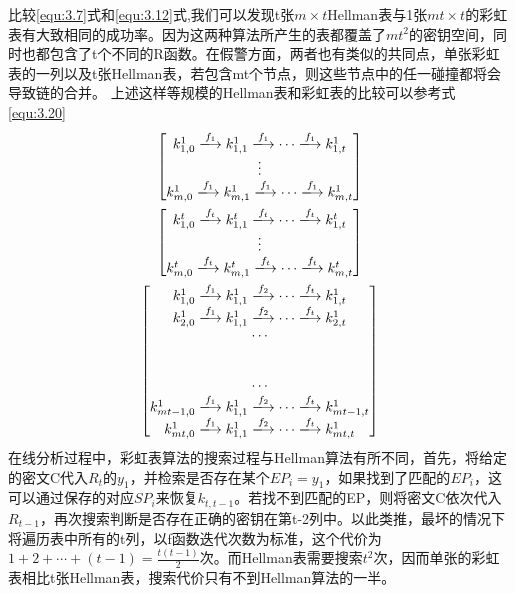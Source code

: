比较\eqref{equ:3.7}式和\eqref{equ:3.12}式,我们可以发现t张$m\times t$Hellman表与1张$mt\times t$的彩虹表有大致相同的成功率。因为这两种算法所产生的表都覆盖了$mt^2$的密钥空间，同时也都包含了t个不同的R函数。在假警方面，两者也有类似的共同点，单张彩虹表的一列以及t张Hellman表，若包含mt个节点，则这些节点中的任一碰撞都将会导致链的合并。
上述这样等规模的Hellman表和彩虹表的比较可以参考式\eqref{equ:3.20}
\begin{gather}
\label{equ:3.20}
\begin{bmatrix}
k_{1,0}^1\xlongrightarrow{f_1} k_{1,1}^1\xlongrightarrow{f_1} \cdots \xlongrightarrow{f_1}k_{1,t}^1 \\
\vdots \\
k_{m,0}^1\xlongrightarrow{f_1} k_{m,1}^1\xlongrightarrow{f_1} \cdots \xlongrightarrow{f_1}k_{m,t}^1 \\
\end{bmatrix} \\ 
\begin{bmatrix}
k_{1,0}^t\xlongrightarrow{f_t} k_{1,1}^t\xlongrightarrow{f_t} \cdots \xlongrightarrow{f_t}k_{1,t}^t \\
\vdots \\
k_{m,0}^t\xlongrightarrow{f_t} k_{m,1}^t\xlongrightarrow{f_t} \cdots \xlongrightarrow{f_t}k_{m,t}^t \\
\end{bmatrix}\\
\begin{bmatrix}
k_{1,0}^1\xlongrightarrow{f_1} k_{1,1}^1\xlongrightarrow{f_2} \cdots \xlongrightarrow{f_t}k_{1,t}^1 \\
k_{2,0}^1\xlongrightarrow{f_1} k_{1,1}^1\xlongrightarrow{f_2} \cdots \xlongrightarrow{f_t}k_{2,t}^1 \\
\cdots \\ 
\\ \\
\cdots \\
k_{mt-1,0}^1\xlongrightarrow{f_1} k_{1,1}^1\xlongrightarrow{f_2} \cdots \xlongrightarrow{f_t}k_{mt-1,t}^1 \\
k_{mt,0}^1\xlongrightarrow{f_1} k_{1,1}^1\xlongrightarrow{f_2} \cdots \xlongrightarrow{f_t}k_{mt,t}^1
\end{bmatrix}
\end{gather}
在线分析过程中，彩虹表算法的搜索过程与Hellman算法有所不同，首先，将给定的密文C代入$R_t$的$y_1$，并检索是否存在某个$EP_i=y_1$，如果找到了匹配的$EP_i$，这可以通过保存的对应$SP_i$来恢复$k_{t,t-1}$。若找不到匹配的EP，则将密文C依次代入$R_{t-1}$，再次搜索判断是否存在正确的密钥在第t-2列中。以此类推，最坏的情况下将遍历表中所有的t列，以f函数迭代次数为标准，这个代价为$1+2+\cdots +(t-1)=\frac{t(t-1)}{2}$次。而Hellman表需要搜索$t^2$次，因而单张的彩虹表相比t张Hellman表，搜索代价只有不到Hellman算法的一半。

